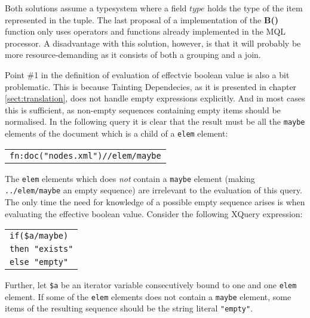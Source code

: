 Both solutions assume a typesystem where a field $type$ holds the type of the item represented in the tuple. The
last proposal of a implementation of the \textbf{B()} function only uses operators and functions already
implemented in the MQL processor. A disadvantage with this solution, however, is that it will probably be more
resource-demanding as it consists of both a grouping and a join.

Point \#1 in the definition of evaluation of effectvie boolean value is also a bit problematic. This is because
Tainting Dependecies, as it is presented in chapter \ref{sect:translation}, does not handle empty expressions
explicitly. And in most cases this is sufficient, as non-empty sequences containing empty items should be
normalised. In the following query it is clear that the result must be all the \texttt{maybe} elements of the
document which is a child of a \texttt{elem} element:

\begin{center}
\begin{tabular}{l}
\texttt{fn:doc("nodes.xml")//elem/maybe}
\end{tabular}
\end{center}

The \texttt{elem} elements which does \emph{not} contain a \texttt{maybe} element (making \texttt{../elem/maybe}
an empty sequence) are irrelevant to the evaluation of this query. The only time the need for knowledge of a
possible empty sequence arises is when evaluating the effective boolean value. Consider the following XQuery
expression:

\begin{center}
\begin{tabular}{l}
\texttt{if(\$a/maybe)} \\ \quad
\texttt{then "exists"} \\ \quad
\texttt{else "empty"}
\end{tabular}
\end{center}

Further, let \texttt{\$a} be an iterator variable consecutively bound to one and one \texttt{elem} element. If
some of the \texttt{elem} elements does not contain a \texttt{maybe} element, some items of the resulting sequence
should be the string literal \texttt{"empty"}.

